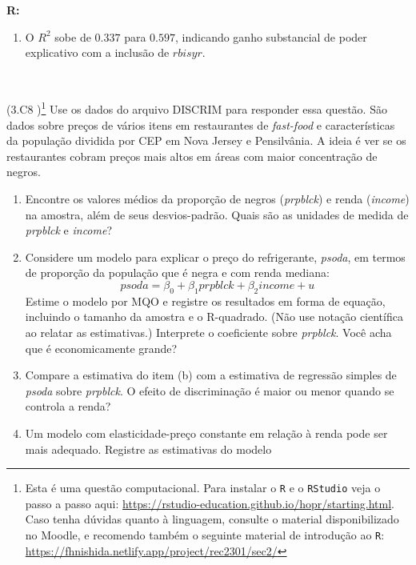 \documentclass[12pt,letterpaper, onecolumn]{exam}
\renewenvironment{solution}
  {\par\noindent\textbf{R:}\enspace\color{blue}}
  {\par\color{black}}
\begin{document}
\begin{questions}
\begin{solution}
\begin{enumerate}[label=(\alph*)]
    \item O \(R^2\) sobe de \(0.337\) para \(0.597\), indicando ganho substancial de poder explicativo com a inclusão de \(rbisyr\).
\end{enumerate}
\end{solution}
\
\


\question\qstar (3.C8 \citep{wooldridge2016})\footnote{Esta é uma questão computacional. Para instalar o \texttt{R} e o \texttt{RStudio} veja o passo a passo aqui: \href{https://rstudio-education.github.io/hopr/starting.html}{https://rstudio-education.github.io/hopr/starting.html}. Caso tenha dúvidas quanto à linguagem, consulte o material disponibilizado no Moodle, e recomendo também o seguinte material de introdução ao \texttt{R}: \href{https://fhnishida.netlify.app/project/rec2301/sec2/}{https://fhnishida.netlify.app/project/rec2301/sec2/} }
Use os dados do arquivo DISCRIM para responder essa questão. São dados sobre preços de vários itens em restaurantes de \textit{fast-food} e características da população dividida por CEP em Nova Jersey e Pensilvânia. A ideia é ver se os restaurantes cobram preços mais altos em áreas com maior concentração de negros.
    \begin{enumerate} [label = (\alph*)]
\item Encontre os valores médios da proporção de negros (\textit{prpblck}) e renda (\textit{income}) na amostra, além de seus desvios-padrão. Quais são as unidades de medida de \textit{prpblck} e \textit{income}?
\item Considere um modelo para explicar o preço do refrigerante, \textit{psoda}, em termos de proporção da população que é negra e com renda mediana: \begin{equation*}
    psoda = \beta_0 + \beta_1prpblck + \beta_2income + u
\end{equation*} Estime o modelo por MQO e registre os resultados em forma de equação, incluindo o tamanho da amostra e o R-quadrado. (Não use notação científica ao relatar as estimativas.) Interprete o coeficiente sobre \textit{prpblck}. Você acha que é economicamente grande?
\item Compare a estimativa do item (b) com a estimativa de regressão simples de \textit{psoda} sobre \textit{prpblck}. O efeito de discriminação é maior ou menor quando se controla a renda?
\item Um modelo com elasticidade-preço constante em relação à renda pode ser mais adequado. Registre as estimativas do modelo\begin{equation*}

\end{equation*}
\end{enumerate}
\end{questions}
\end{document}
